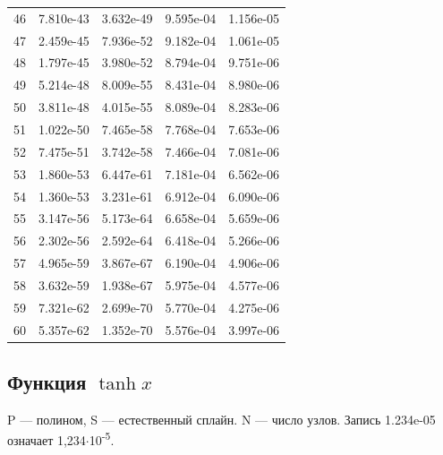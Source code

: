 \documentclass[12pt,a4paper]{article}
\begin{document}
\begin{longtable}{rrrrr}
46 & 7.810e-43 & 3.632e-49 & 9.595e-04 & 1.156e-05\\
47 & 2.459e-45 & 7.936e-52 & 9.182e-04 & 1.061e-05\\
48 & 1.797e-45 & 3.980e-52 & 8.794e-04 & 9.751e-06\\
49 & 5.214e-48 & 8.009e-55 & 8.431e-04 & 8.980e-06\\
50 & 3.811e-48 & 4.015e-55 & 8.089e-04 & 8.283e-06\\
51 & 1.022e-50 & 7.465e-58 & 7.768e-04 & 7.653e-06\\
52 & 7.475e-51 & 3.742e-58 & 7.466e-04 & 7.081e-06\\
53 & 1.860e-53 & 6.447e-61 & 7.181e-04 & 6.562e-06\\
54 & 1.360e-53 & 3.231e-61 & 6.912e-04 & 6.090e-06\\
55 & 3.147e-56 & 5.173e-64 & 6.658e-04 & 5.659e-06\\
56 & 2.302e-56 & 2.592e-64 & 6.418e-04 & 5.266e-06\\
57 & 4.965e-59 & 3.867e-67 & 6.190e-04 & 4.906e-06\\
58 & 3.632e-59 & 1.938e-67 & 5.975e-04 & 4.577e-06\\
59 & 7.321e-62 & 2.699e-70 & 5.770e-04 & 4.275e-06\\
60 & 5.357e-62 & 1.352e-70 & 5.576e-04 & 3.997e-06\\
\bottomrule\end{longtable}\endgroup
\clearpage
\subsection*{Функция $\tanh x$}
P — полином, S — естественный сплайн. N — число узлов. Запись 1.234e-05 означает 1,234\ensuremath{\cdot}10\textsuperscript{-5}.
\end{document}
